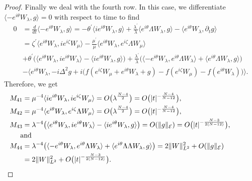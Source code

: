 \documentclass[a4paper,two-side,10pt]{amsart}
\numberwithin{equation}{section}
\begin{document}
\begin{proof}
Finally we deal with the fourth row. In this case, we differentiate $\langle -e^{i\theta}  W_\lambda ,g\rangle =0$ with respect to time to find
\begin{align*}
0&= \frac{d}{dt} \langle -e^{i\theta} W_\lambda ,g\rangle = - \theta^\prime \langle ie^{i\theta}  W_\lambda ,g \rangle + \frac{\lambda^\prime}{\lambda} \langle e^{i\theta}   \Lambda W_\lambda ,g \rangle - \langle e^{i\theta}  W_\lambda ,\partial_t g \rangle \\
&= \zeta^\prime \langle  e^{i\theta}  W_\lambda , i e^{i\zeta} W_\mu \rangle  -\frac{\mu^\prime}{\mu} \langle   e^{i\theta}  W_\lambda , e^{i\zeta} \Lambda W_\mu\rangle\\
&+\theta^\prime \big(\langle e^{i\theta}  W_\lambda ,i e^{i\theta} W_\lambda \rangle - \langle i e^{i\theta}  W_\lambda ,g\rangle\big) +\frac{\lambda^\prime}{\lambda}\big( \langle - e^{i\theta}   W_\lambda , e^{i\theta} \Lambda W_\lambda \rangle +\langle e^{i\theta}  \Lambda W_\lambda ,g \rangle \big) \\
&- \big\langle  e^{i\theta} W_\lambda , -i \Delta^2 g +i \big(f(e^{i\zeta} W_\mu +e^{i\theta} W_\lambda +g) - f(e^{i\zeta} W_\mu) - f(e^{i\theta} W_\lambda)\big) \big\rangle .
\end{align*}
Therefore, we get
\begin{align*}
M_{41} &= \mu^{-4}\langle i e^{i\theta}  W_\lambda ,  i e^{i\zeta} W_\mu \rangle  = O\big(\lambda^{\frac{N-4}{2}}\big)=O\big(|t|^{-\frac{N-4}{N-12}}\big),\\
M_{42}&= \mu^{-4}  \langle   e^{i\theta}  W_\lambda , e^{i\zeta} \Lambda W_\mu\rangle  = O\big(\lambda^{\frac{N-4}{2}}\big)
=O\big(|t|^{-\frac{N-4}{N-12}}\big),\\
M_{43}&= \lambda^{-4}  \big(\langle e^{i\theta} W_\lambda ,i e^{i\theta} W_\lambda \rangle - \langle i e^{i\theta}  W_\lambda ,g\rangle\big)  = O(\|g\|_{\mathcal{E}})
 =
O\big(|t|^{-\frac{N-3}{2(N-12)}}\big),\\
\noalign{and}
M_{44}&= \lambda^{-4} \big( \langle -e^{i\theta}   W_\lambda , e^{i\theta} \Lambda W_\lambda \rangle +\langle e^{i\theta} \Lambda \Lambda W_\lambda ,g \rangle \big)=2 \|W\|_{L^2}^2 +O(\|g\|_{\mathcal{E}})\\
&= 2 \|W\|_{L^2}^2 +O\big(|t|^{-\frac{N-3}{2(N-12)}}\big).
\end{align*}


\end{proof}
\end{document}
